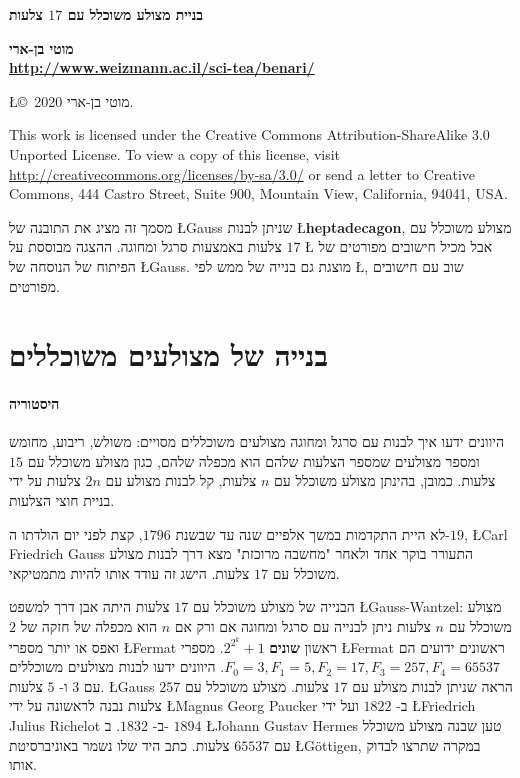 \documentclass[11pt,a4paper]{article}
\begin{document}
\thispagestyle{empty}
\begin{center}
\textbf{\LARGE בניית מצולע משוכלל עם 
$17$
צלעות}

\bigskip

\textbf{\Large מוטי בן-ארי\\\bigskip\url{http://www.weizmann.ac.il/sci-tea/benari/}}

\bigskip
\end{center}


\begin{footnotesize}
\begin{center}
\L{\copyright{}\  2020} מוטי בן-ארי. 
\end{center}
This work is licensed under the Creative Commons Attribution-ShareAlike 3.0 Unported License. To view a copy of this license, visit \url{http://creativecommons.org/licenses/by-sa/3.0/} or send a letter to Creative Commons, 444 Castro Street, Suite 900, Mountain View, California, 94041, USA.

\end{footnotesize}
מסמך זה מציג את התובנה של 
\L{Gauss}
שניתן לבנות 
\L{\textbf{heptadecagon}},
מצולע משוכלל עם 
$17$
צלעות באמצעות סרגל ומחוגה.
ההצגה מבוססת על
\L{\cite{jorg}}
אבל מכיל חישובים מפורטים של הפיתוח של הנוסחה של
\L{Gauss}.
מוצגת גם בנייה של ממש לפי
\L{\cite{callagy}},
שוב עם חישובים מפורטים.

\section{בנייה של מצולעים משוכללים}

\paragraph{היסטוריה}
היוונים ידעו איך לבנות  עם סרגל ומחוגה מצולעים משוכללים מסויים: משולש, ריבוע, מחומש ומספר מצולעים שמספר הצלעות שלהם הוא מכפלה שלהם, כגון מצולע משוכלל עם $15$
צלעות.
כמובן, בהינתן מצולע משוכלל עם
$n$
צלעות, קל לבנות מצולע עם 
$2n$
צלעות על ידי בניית חוצי הצלעות.

לא היית התקדמות במשך אלפיים שנה עד שבשנת
$1796$,
קצת לפני יום הולדתו ה-$19$,
\L{Carl Friedrich Gauss}
התעורר בוקר אחד ולאחר "מחשבה מרוכזת" מצא דרך לבנות מצולע משוכלל עם 
$17$
צלעות. הישג זה עודד אותו להיות מתמטיקאי.

הבנייה של מצולע משוכלל עם 
$17$
צלעות היתה אבן דרך למשפט
\L{Gauss-Wantzel}:
מצולע משוכלל עם 
$n$
צלעות ניתן לבנייה עם סרגל ומחוגה אם ורק אם 
$n$
הוא מכפלה של חזקה של
$2$
ואפס או יותר מספרי 
\L{Fermat}
ראשון
\textbf{שונים}
$2^{2^k}+1$. 
מספרי 
\L{Fermat}
ראשונים ידועים הם
$F_0=3, F_1=5, F_2=17, F_3=257, F_4=65537$.
היוונים ידעו לבנות מצולעים משוכללים עם
$3$
ו-%
$5$
צלעות.
\L{Gauss}
הראה שניתן לבנות מצולע עם
$17$
צלעות.
מצולע משוכלל עם
$257$
צלעות נבנה לראשונה על ידי
\L{Magnus Georg Paucker}
ב-%
$1822$
ועל ידי
\L{Friedrich Julius Richelot}
ב-%
$1832$.
ב-%
$1894$
\L{Johann Gustav Hermes}
טען שבנה מצולע משוכלל עם
$65537$
צלעות.
כתב היד שלו נשמר באוניברסיטת 
\L{G\"{o}ttigen},
במקרה שתרצו לבדוק אותו.
\end{document}
